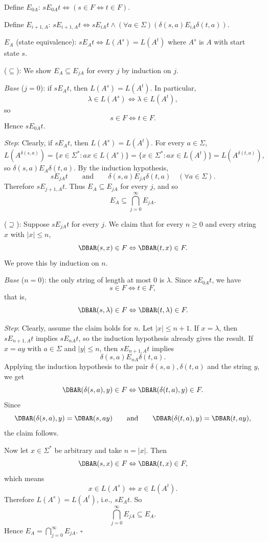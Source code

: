 \begin{enumerate}[{3.}1.]
Define $E_{0A}$: $s E_{0A} t\Leftrightarrow(s\in F\Leftrightarrow t\in F)$.

Define $E_{i+1,A}$: $s E_{i+1,A} t\Leftrightarrow s E_{iA} t\wedge(\forall a\in\Sigma)(\delta(s,a) E_{iA} \delta(t,a))$.

$E_A$ (state equivalence): $s E_A t\Leftrightarrow L(A^s)=L(A^t)$ where $A^s$ is $A$ with start state $s$.

($\subseteq$): We show $E_A\subseteq E_{jA}$ for every $j$ by induction on $j$.

\textit{Base} ($j=0$): if $s E_A t$, then $L(A^s)=L(A^t)$. In particular,
\[
\lambda\in L(A^s)\Leftrightarrow \lambda\in L(A^t),
\]
so
\[
s\in F \Leftrightarrow t\in F.
\]
Hence $s E_{0A} t$.

\textit{Step}: Clearly, if $s E_A t$, then
$L(A^s)=L(A^t)$. For every $a\in\Sigma$,
\[
L(A^{\delta(s,a)})=\{x\in\Sigma^*:ax\in L(A^s)\}
=\{x\in\Sigma^*:ax\in L(A^t)\}
=L(A^{\delta(t,a)}),
\]
so $\delta(s,a) E_A \delta(t,a)$. By the induction hypothesis,
\[
s E_{jA} t
\qquad\text{and}\qquad
\delta(s,a) E_{jA} \delta(t,a)\quad(\forall a\in\Sigma).
\]
Therefore $s E_{j+1,A} t$. Thus $E_A\subseteq E_{jA}$ for every $j$, and so
\[
E_A\subseteq \bigcap_{j=0}^\infty E_{jA}.
\]

($\supseteq$): Suppose $s E_{jA} t$ for every $j$. We claim that for every
$n\geq 0$ and every string $x$ with $|x|\leq n$,
\[
\DBAR(s,x)\in F \Leftrightarrow \DBAR(t,x)\in F.
\]
We prove this by induction on $n$.

\textit{Base} ($n=0$): the only string of length at most $0$ is $\lambda$. Since
$s E_{0A} t$, we have
\[
s\in F \Leftrightarrow t\in F,
\]
that is,
\[
\DBAR(s,\lambda)\in F \Leftrightarrow \DBAR(t,\lambda)\in F.
\]

\textit{Step}: Clearly, assume the claim holds for $n$. Let $|x|\leq n+1$.
If $x=\lambda$, then $s E_{n+1,A} t$ implies $s E_{nA} t$, so the induction
hypothesis already gives the result. If $x=ay$ with $a\in\Sigma$ and $|y|\leq n$,
then $s E_{n+1,A} t$ implies
\[
\delta(s,a) E_{nA} \delta(t,a).
\]
Applying the induction hypothesis to the pair $\delta(s,a),\delta(t,a)$ and the
string $y$, we get
\[
\DBAR(\delta(s,a),y)\in F \Leftrightarrow \DBAR(\delta(t,a),y)\in F.
\]
Since
\[
\DBAR(\delta(s,a),y)=\DBAR(s,ay)
\qquad\text{and}\qquad
\DBAR(\delta(t,a),y)=\DBAR(t,ay),
\]
the claim follows.

Now let $x\in\Sigma^*$ be arbitrary and take $n=|x|$. Then
\[
\DBAR(s,x)\in F \Leftrightarrow \DBAR(t,x)\in F,
\]
which means
\[
x\in L(A^s)\Leftrightarrow x\in L(A^t).
\]
Therefore $L(A^s)=L(A^t)$, i.e., $s E_A t$. So
\[
\bigcap_{j=0}^\infty E_{jA}\subseteq E_A.
\]
Hence $E_A=\bigcap_{j=0}^\infty E_{jA}$. $\square$


\end{enumerate}
